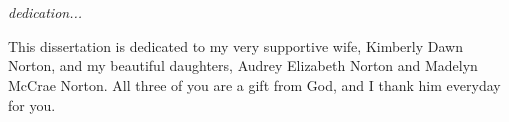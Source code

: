 \chapter*{}
\begin{center}
{\centering \it dedication... }

This dissertation is dedicated to my very supportive wife, Kimberly Dawn Norton, 
and my beautiful daughters, Audrey Elizabeth Norton and Madelyn McCrae Norton. All three of you are a gift from God, and I thank him everyday for you.
\end{center} 
